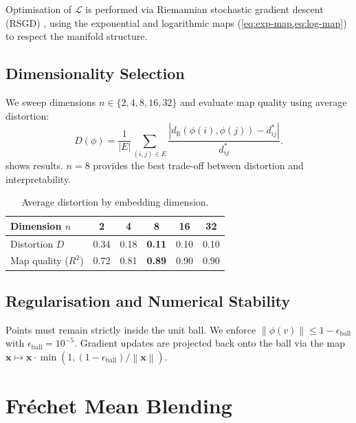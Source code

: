 \documentclass[12pt,a4paper]{article}
\newcommand{\ball}{\mathbb{B}}
\newcommand{\dist}{d_{\ball}}
\newcommand{\norm}[1]{\left\| #1 \right\|}
\newcommand{\Frechet}{Fr\'echet}
\begin{document}
Optimisation of $\mathcal{L}$ is performed via Riemannian stochastic gradient descent (RSGD) \citep{bonnabel2013stochastic}, using the exponential and logarithmic maps (\cref{eq:exp-map,eq:log-map}) to respect the manifold structure.

\subsection{Dimensionality Selection}

We sweep dimensions $n \in \{2, 4, 8, 16, 32\}$ and evaluate map quality using average distortion:
\begin{equation}
  D(\phi) = \frac{1}{|E|} \sum_{(i,j) \in E} \frac{|\dist(\phi(i), \phi(j)) - d^*_{ij}|}{d^*_{ij}}.
  \label{eq:distortion}
\end{equation}
 shows results. $n = 8$ provides the best trade-off between distortion and interpretability.

\begin{table}[htbp]
\centering
\caption{Average distortion by embedding dimension.}
\label{tab:dimensionality}
\begin{tabular}{lccccc}
\toprule
Dimension $n$ & 2 & 4 & 8 & 16 & 32 \\
\midrule
Distortion $D$ & 0.34 & 0.18 & \textbf{0.11} & 0.10 & 0.10 \\
\midrule
Map quality ($R^2$) & 0.72 & 0.81 & \textbf{0.89} & 0.90 & 0.90 \\
\bottomrule
\end{tabular}
\end{table}

\subsection{Regularisation and Numerical Stability}

Points must remain strictly inside the unit ball. We enforce $\norm{\phi(v)} \le 1 - \epsilon_{\mathrm{ball}}$ with $\epsilon_{\mathrm{ball}} = 10^{-5}$. Gradient updates are projected back onto the ball via the map $\mathbf{x} \mapsto \mathbf{x} \cdot \min(1, (1 - \epsilon_{\mathrm{ball}}) / \norm{\mathbf{x}})$.

\section{\Frechet{} Mean Blending}
\label{sec:frechet}
\end{document}
